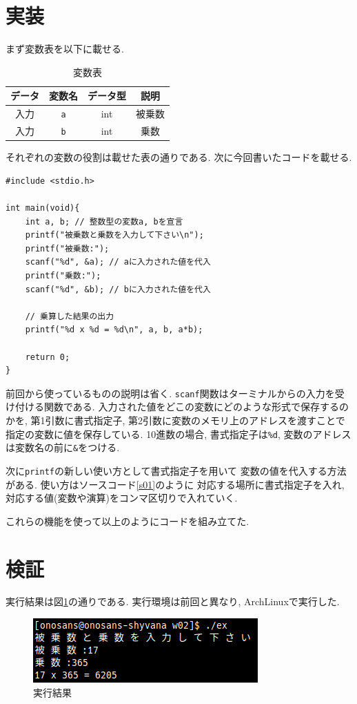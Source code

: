 \documentclass[a4paper, xelatex, ja=standard]{bxjsarticle}
\begin{document}
\section{実装}
まず変数表を以下に載せる.

\begin{table}[h]
\centering
\caption{変数表}
\label{}
\begin{tabular}{|c|c|c|c|}
\hline
データ & 変数名                         & データ型 & 説明  \\ \hline
入力  & \texttt{a} & int  & 被乗数 \\ \hline
入力  & \texttt{b} & int  & 乗数  \\ \hline
\end{tabular}
\end{table}

それぞれの変数の役割は載せた表の通りである.
次に今回書いたコードを載せる.

\begin{lstlisting}[caption=ソースコード,label=s01]
#include <stdio.h>

int main(void){
	int a, b; // 整数型の変数a, bを宣言
	printf("被乗数と乗数を入力して下さい\n");
	printf("被乗数:");
	scanf("%d", &a); // aに入力された値を代入
	printf("乗数:");
	scanf("%d", &b); // bに入力された値を代入

	// 乗算した結果の出力
	printf("%d x %d = %d\n", a, b, a*b);

	return 0;
}
\end{lstlisting}

前回から使っているものの説明は省く.
\texttt{scanf}関数はターミナルからの入力を受け付ける関数である.
入力された値をどこの変数にどのような形式で保存するのかを,
第1引数に書式指定子, 第2引数に変数のメモリ上のアドレスを渡すことで
指定の変数に値を保存している.
10進数の場合, 書式指定子は\texttt{\%d},
変数のアドレスは変数名の前に\texttt{\&}をつける.

次に\texttt{printf}の新しい使い方として書式指定子を用いて
変数の値を代入する方法がある.
使い方はソースコード\ref{s01}のように
対応する場所に書式指定子を入れ,
対応する値(変数や演算)をコンマ区切りで入れていく.

これらの機能を使って以上のようにコードを組み立てた.

\section{検証}
実行結果は図\ref{fig:result}の通りである.
実行環境は前回と異なり, 
ArchLinuxで実行した.
\begin{figure}[h]
\centering
\includegraphics[scale=1.0]{../img/terminal_result.png}
\caption{実行結果}
\label{fig:result}
\end{figure}
\end{document}
